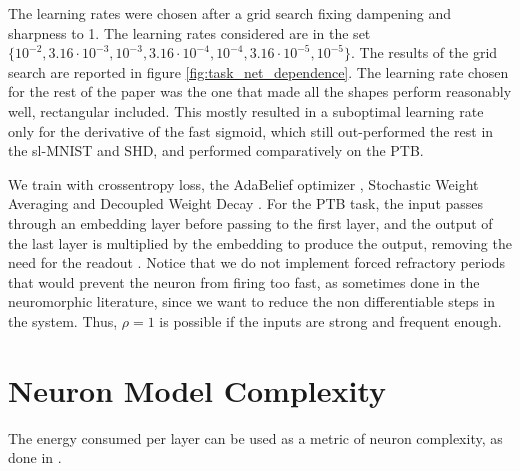 The learning rates were chosen after a grid search fixing dampening and sharpness to 1.  The learning rates considered are in the set $\{10^{-2},3.16 \cdot10^{-3}, 10^{-3}, 3.16 \cdot10^{-4}, 10^{-4}, 3.16 \cdot10^{-5},10^{-5 }\}$. The results of the grid search are reported in figure \ref{fig:task_net_dependence}. The learning rate chosen for the rest of the paper was the one that made all the shapes perform reasonably well, rectangular included. This mostly resulted in a suboptimal learning rate only for the derivative of the fast sigmoid, which still out-performed the rest in the sl-MNIST and SHD, and performed comparatively on the PTB. 

We train with crossentropy loss, the AdaBelief optimizer \cite{zhuang2020adabelief}, Stochastic Weight Averaging \cite{swa2018} and Decoupled Weight Decay \cite{loshchilov2018decoupled}. 
For the PTB task, the input passes through an embedding layer before passing to the first layer, and the output of the last layer is multiplied by the embedding to produce the output, removing the need for the readout
\cite{wozniak2020deep, radford2018improving}.
Notice that we do not implement forced refractory periods that would prevent the neuron from firing too fast, as sometimes done in the neuromorphic literature, since we want to reduce the non differentiable steps in the system. Thus, $\rho=1$ is possible if the inputs are strong and frequent enough.

\section{Neuron Model Complexity}

The energy consumed per layer can be used as a metric of neuron complexity, as done in \cite{yin2021accurate, hunger2005floating}.

